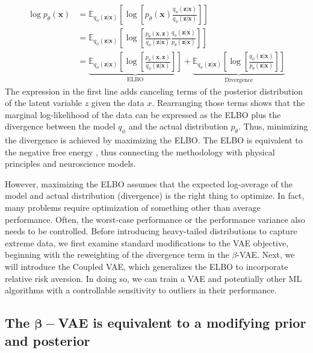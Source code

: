 \documentclass[twoside,11pt]{article}
\begin{document}
\begin{equation}
\begin{split}
    \log p_\theta(\mathbf{x}) 
    &=\mathbb{E}_
    {q_\phi(\mathbf{z|x})}
    \left[\log \left[p_\theta(\mathbf{x})
    \frac{q_\phi(\mathbf{z|x})}{q_\phi(\mathbf{z|x})}\right]\right] \\
    &=\mathbb{E}_
    {q_\phi(\mathbf{z|x})}
    \left[\log \left[\frac{p_\theta(\mathbf{x,z})}{q_\phi(\mathbf{z|x})}
    \frac{q_\phi(\mathbf{z|x})}
    {p_\theta(\mathbf{z|x})}\right]\right] \\
    &=\underbrace{\mathbb{E}_
    {q_\phi(\mathbf{z|x})}
    \left[\log \left[\frac{ p_\theta(\mathbf{x,z})}
    {q_\phi(\mathbf{z|x})}\right]\right]}_
    {\text{ELBO}}+ \underbrace{\mathbb{E}_{q_\phi(\mathbf{z|x})}
    \left[\log \left[\frac{q_\phi(\mathbf{z|x})}
    { p_\theta(\mathbf{z|x})}\right]\right]}_
    {\text{Divergence}}
\end{split}
\end{equation}
The expression in the first line adds canceling terms of the posterior distribution of the latent variable $z$ given the data $x$. Rearranging those terms shows that the marginal log-likelihood of the data can be expressed as the ELBO plus the divergence between the model $q_\phi$ and the actual distribution $p_\theta$. Thus, minimizing the divergence is achieved by maximizing the ELBO. The ELBO is equivalent to the negative free energy \citep{fristonFreeEnergyPrinciple2006}, thus connecting the methodology with physical principles and neuroscience models.

However, maximizing the ELBO assumes that the expected log-average of the model and actual distribution (divergence) is the right thing to optimize. In fact, many problems require optimization of something other than average performance. Often, the worst-case performance or the performance variance also needs to be controlled. Before introducing heavy-tailed distributions to capture extreme data, we first examine standard modifications to the VAE objective, beginning with the reweighting of the divergence term in the $\beta$-VAE. Next, we will introduce the Coupled VAE, which generalizes the ELBO to incorporate relative risk aversion. In doing so, we can train a VAE and potentially other ML algorithms with a controllable sensitivity to outliers in their performance.

\subsection[The beta-VAE is equivalent to modified prior]{The $\boldsymbol{\beta}-$VAE is equivalent to a modifying prior and posterior}
\end{document}
